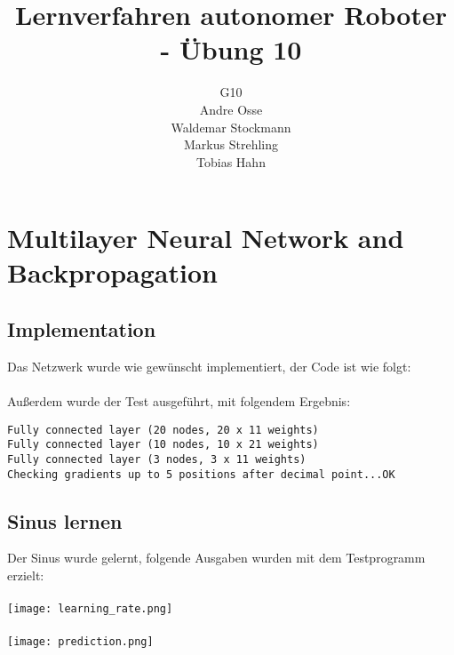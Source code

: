 \documentclass{article}
\title{Lernverfahren autonomer Roboter - Übung 10}
\author{G10\\ Andre Osse\\ Waldemar Stockmann\\ Markus Strehling\\ Tobias Hahn}
\begin{document}
\maketitle
\newpage
\section{Multilayer Neural Network and Backpropagation}

\subsection{Implementation}
Das Netzwerk wurde wie gewünscht implementiert, der Code ist wie folgt:



\paragraph{}
Außerdem wurde der Test ausgeführt, mit folgendem Ergebnis:
\begin{lstlisting}
Fully connected layer (20 nodes, 20 x 11 weights)
Fully connected layer (10 nodes, 10 x 21 weights)
Fully connected layer (3 nodes, 3 x 11 weights)
Checking gradients up to 5 positions after decimal point...OK
\end{lstlisting}

\subsection{Sinus lernen}
Der Sinus wurde gelernt, folgende Ausgaben wurden mit dem Testprogramm erzielt:
\paragraph{}
\texttt{[image: learning\_rate.png]}
\paragraph{}
\texttt{[image: prediction.png]}
\end{document}
